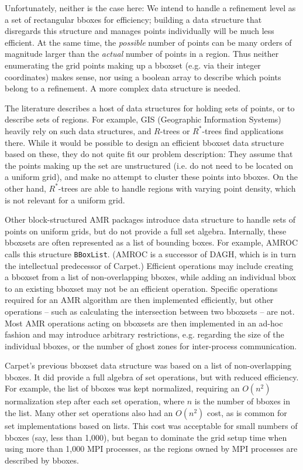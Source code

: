 \documentclass[conference]{IEEEtran}
\begin{document}
Unfortunately, neither is the case here: We intend to handle a
refinement level as a set of rectangular bboxes for efficiency;
building a data
structure that disregards this structure and manages points
individually will be much less efficient. At the same time, the
\emph{possible} number of points can be many orders of magnitude
larger than the \emph{actual} number of points in a region. Thus neither
enumerating the grid points making up a bboxset (e.g. via their
integer coordinates) makes sense, nor using a boolean array to
describe which points belong to a refinement.
A more complex data structure is needed.

The literature describes a host of data structures for holding sets of
points, or
to describe sets of regions. For example, GIS (Geographic Information
Systems) heavily rely on such data structures, and $R$-trees or
$R^*$-trees \cite{wiki:rstar-tree} find applications there. While it
would be possible to design an efficient bboxset data structure
based on these, they do not quite fit our problem
description: They assume that the points making up the set are
unstructured (i.e. do not need to be located on a uniform grid), and make no
attempt to cluster these points into bboxes. On the other hand,
$R^*$-trees are able to handle regions with varying point density,
which is not relevant for a uniform grid.

Other block-structured AMR packages introduce data structure to handle
sets of points on uniform grids, but do not provide a full set
algebra. Internally, these bboxsets are often represented as a list of
bounding boxes. For example, AMROC \cite{amrocweb} calls this
structure \verb+BBoxList+. (AMROC is a successor of DAGH, which is in
turn the intellectual predecessor of Carpet.)
Efficient operations may include creating a bboxset from a list of
non-overlapping bboxes, while adding an individual bbox to an existing
bboxset may not be an efficient operation. Specific operations required
for an AMR algorithm are then implemented efficiently, but other
operations -- such as calculating the intersection between two
bboxsets -- are not. Most AMR operations acting on bboxsets are then
implemented in an ad-hoc fashion and may introduce arbitrary
restrictions, e.g. regarding the size of the individual bboxes, or the
number of ghost zones for inter-process communication.

Carpet's previous bboxset data structure was based on a list of
non-overlapping bboxes. It did provide a full algebra of set
operations, but with reduced efficiency. For example, the list of
bboxes was kept normalized, requiring an $O(n^2)$ normalization step after
each set operation, where $n$ is the number of bboxes in the list.
Many other set
operations also had an $O(n^2)$ cost, as is common for set
implementations based on lists. This cost was acceptable for small
numbers of bboxes (say, less than 1,000), but began to dominate the
grid setup time when using more than 1,000 MPI processes, as the
regions owned by MPI processes are described by bboxes.
\end{document}
